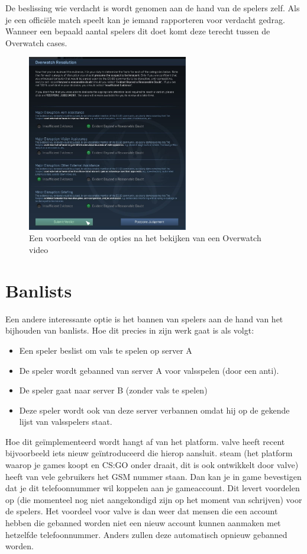 \documentclass[pdftex,a4paper,12pt,twoside]{report}
\begin{document}
De beslissing wie verdacht is wordt genomen aan de hand van de spelers zelf. Als je een officiële match speelt kan je iemand rapporteren voor verdacht gedrag. Wanneer een bepaald aantal spelers dit doet komt deze terecht tussen de Overwatch cases.

\begin{figure}
\centering
\includegraphics[width=7cm]{img/overwatch-example}
\caption{Een voorbeeld van de opties na het bekijken van een Overwatch video}
\end{figure}

\section{Banlists}
\label{sec:banlists}

Een andere interessante optie is het bannen van spelers aan de hand van het bijhouden van banlists. Hoe dit precies in zijn werk gaat is als volgt:
\begin{itemize}
\item Een speler beslist om vals te spelen op server A
\item De speler wordt gebanned van server A voor valsspelen (door een \gls{anti}).
\item De speler gaat naar server B (zonder vals te spelen)
\item Deze speler wordt ook van deze server verbannen omdat hij op de gekende lijst van valsspelers staat. 
\\
\end{itemize}


Hoe dit geïmplementeerd wordt hangt af van het platform. \gls{valve} heeft recent bijvoorbeeld iets nieuw geïntroduceerd die hierop aansluit. \gls{steam} (het platform waarop je games koopt en CS:GO onder draait, dit is ook ontwikkelt door \gls{valve}) heeft van vele gebruikers het GSM nummer staan. 
Dan kan je in game bevestigen dat je dit telefoonnummer wil koppelen aan je gameaccount. Dit levert voordelen op (die momenteel nog niet aangekondigd zijn op het moment van schrijven) voor de spelers. Het voordeel voor \gls{valve} is dan weer dat mensen die een account hebben die gebanned worden niet een nieuw account kunnen aanmaken met hetzelfde telefoonnummer. Anders zullen deze automatisch opnieuw gebanned worden. 
\end{document}
